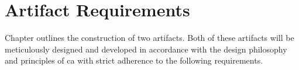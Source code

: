\section{Artifact Requirements} \label{sec_artifact_requirements}

Chapter  outlines the construction of two artifacts. Both
of these artifacts will be meticulously designed and developed in accordance with the
design philosophy and principles of \gls{ca} with strict adherence to the following
requirements.




